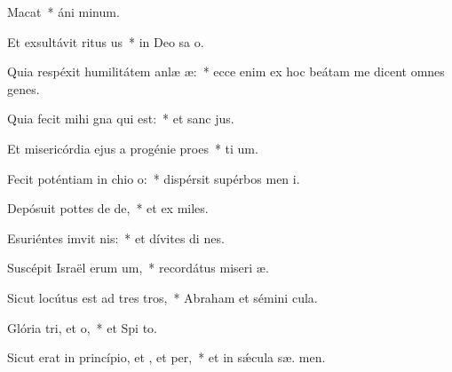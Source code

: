\item Macat~* áni  minum.
\item Et exsultávit ritus us~* in Deo sa o.
\item Quia respéxit humilitátem anlæ æ:~* ecce enim ex hoc beátam me dicent omnes genes.
\item Quia fecit mihi gna qui  est:~* et sanc  jus.
\item Et misericórdia ejus a progénie  proes~* ti um.
\item Fecit poténtiam in chio o:~* dispérsit supérbos men  i.
\item Depósuit pottes de de,~* et ex miles.
\item Esuriéntes imvit nis:~* et dívites di nes.
\item Suscépit Israël erum um,~* recordátus miseri æ.
\item Sicut locútus est ad tres tros,~* Abraham et sémini   cula.
\item Glória tri, et o,~* et Spi to.
\item Sicut erat in princípio, et , et per,~* et in sǽcula sæ. men.
